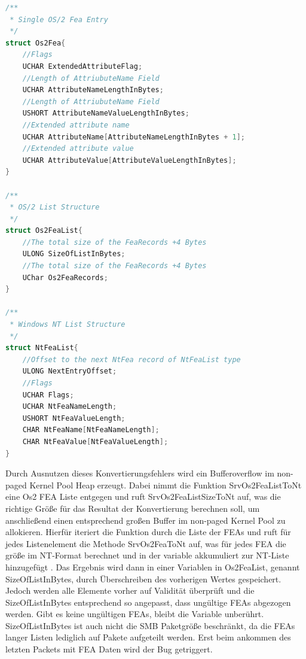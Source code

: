 \documentclass[DIV=12,headings=normal,pdftex,headinclude=false,footinclude=false,final]{scrreprt}
\begin{document}
\begin{lstlisting}[language=C,caption={Die zwei relevanten FEAs und exemplarisch die NTFEA-Liste\cite{CP}},captionpos=b]
/**
 * Single OS/2 Fea Entry
 */
struct Os2Fea{
    //Flags
    UCHAR ExtendedAttributeFlag;
    //Length of AttriubuteName Field
    UCHAR AttributeNameLengthInBytes;
    //Length of AttriubuteName Field
    USHORT AttributeNameValueLengthInBytes;
    //Extended attribute name
    UCHAR AttributeName[AttributeNameLengthInBytes + 1];
    //Extended attribute value
    UCHAR AttributeValue[AttributeValueLengthInBytes]; 
}
 
/**
 * OS/2 List Structure
 */
struct Os2FeaList{
    //The total size of the FeaRecords +4 Bytes
    ULONG SizeOfListInBytes; 
    //The total size of the FeaRecords +4 Bytes
    UChar Os2FeaRecords;
}
 
/**
 * Windows NT List Structure
 */
struct NtFeaList{
    //Offset to the next NtFea record of NtFeaList type
    ULONG NextEntryOffset;
    //Flags
    UCHAR Flags;
    UCHAR NtFeaNameLength;
    USHORT NtFeaValueLength;
    CHAR NtFeaName[NtFeaNameLength];
    CHAR NtFeaValue[NtFeaValueLength];
}
\end{lstlisting}

\noindent
Durch Ausnutzen dieses Konvertierungsfehlers wird ein Bufferoverflow im non-paged Kernel Pool Heap erzeugt. Dabei nimmt die Funktion SrvOs2FeaListToNt eine Os2 FEA Liste entgegen und ruft SrvOs2FeaListSizeToNt auf, was die richtige Größe für das Resultat der Konvertierung berechnen soll, um anschließend  einen entsprechend großen Buffer im non-paged Kernel Pool zu allokieren. Hierfür iteriert die Funktion durch die Liste der FEAs und ruft für jedes Listenelement die Methode SrvOs2FeaToNt auf, was für jedes FEA die größe im NT-Format berechnet und in der variable akkumuliert zur NT-Liste hinzugefügt \cite{TM:EB}. Das Ergebnis wird dann in einer Variablen in Os2FeaList, genannt SizeOfListInBytes, durch Überschreiben des vorherigen Wertes gespeichert. Jedoch werden alle Elemente vorher auf Validität überprüft und die SizeOfListInBytes entsprechend so angepasst, dass ungültige FEAs abgezogen werden. Gibt es keine ungültigen FEAs, bleibt die Variable unberührt. SizeOfListInBytes ist auch nicht die SMB Paketgröße beschränkt, da die FEAs langer Listen lediglich auf Pakete aufgeteilt werden. Erst beim ankommen des letzten Packets mit FEA Daten wird der Bug getriggert\cite{CP}.
\end{document}
